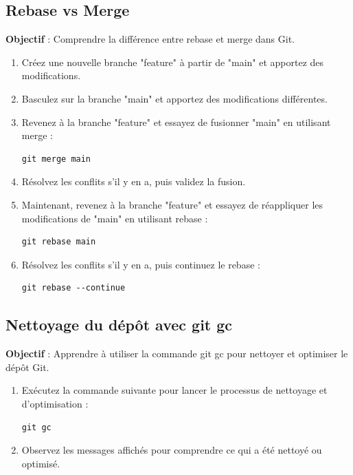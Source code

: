 \subsection*{Rebase vs Merge}
{}
\noindent \textbf{Objectif} : Comprendre la différence entre rebase et merge dans Git.

\begin{enumerate}
	\item Créez une nouvelle branche "feature" à partir de "main" et apportez des modifications.
	\item Basculez sur la branche "main" et apportez des modifications différentes.
	\item Revenez à la branche "feature" et essayez de fusionner "main" en utilisant merge :
	\begin{verbatim}
git merge main
	\end{verbatim}
	\item Résolvez les conflits s'il y en a, puis validez la fusion.
	\item Maintenant, revenez à la branche "feature" et essayez de réappliquer les modifications de "main" en utilisant rebase :
	\begin{verbatim}
git rebase main
	\end{verbatim}
	\item Résolvez les conflits s'il y en a, puis continuez le rebase :
	\begin{verbatim}
git rebase --continue
	\end{verbatim}
\end{enumerate}

\subsection*{Nettoyage du dépôt avec git gc}
{}
\noindent \textbf{Objectif} : Apprendre à utiliser la commande git gc pour nettoyer et optimiser le dépôt Git.

\begin{enumerate}
	\item Exécutez la commande suivante pour lancer le processus de nettoyage et d'optimisation :
	\begin{verbatim}
git gc
	\end{verbatim}
	\item Observez les messages affichés pour comprendre ce qui a été nettoyé ou optimisé.
\end{enumerate}

